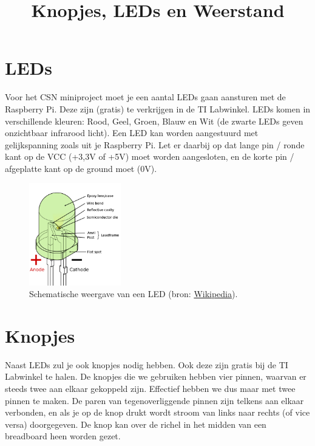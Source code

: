\documentclass{guide}
\title{Knopjes, LEDs en Weerstand}
\begin{document}
\section{LEDs}
Voor het CSN miniproject moet je een aantal LEDs gaan aansturen met de Raspberry Pi. Deze zijn (gratis) te verkrijgen in de TI Labwinkel. LEDs komen in verschillende kleuren: Rood, Geel, Groen, Blauw en Wit (de zwarte LEDs geven onzichtbaar infrarood licht). Een LED kan worden aangestuurd met gelijkspanning zoals uit je Raspberry Pi. Let er daarbij op dat lange pin / ronde kant op de VCC (+3,3V of +5V) moet worden aangesloten, en de korte pin / afgeplatte kant op de ground moet (0V).

\begin{figure}[h]
  \centering
  \includegraphics[width=4cm]{images/led.png}
  \caption{Schematische weergave van een LED (bron: \href{https://upload.wikimedia.org/wikipedia/commons/thumb/f/f9/LED\%2C_5mm\%2C_green_\%28en\%29.svg/1000px-LED\%2C_5mm\%2C_green_\%28en\%29.svg.png}{Wikipedia}).} \label{fig:led}
\end{figure}

\section{Knopjes}
Naast LEDs zul je ook knopjes nodig hebben. Ook deze zijn gratis bij de TI Labwinkel te halen. De knopjes die we gebruiken hebben vier pinnen, waarvan er steeds twee aan elkaar gekoppeld zijn. Effectief hebben we dus maar met twee pinnen te maken. De paren van tegenoverliggende pinnen zijn telkens aan elkaar verbonden, en als je op de knop drukt wordt stroom van links naar rechts (of vice versa) doorgegeven. De knop kan over de richel in het midden van een breadboard heen worden gezet.
\end{document}
